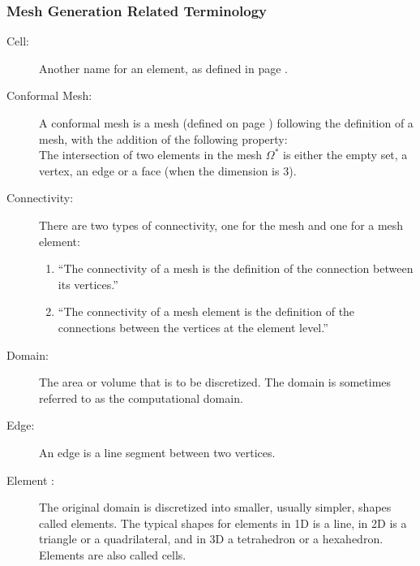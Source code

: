 \documentclass[12pt,titlepage]{article}
\begin{document}
\subsubsection{Mesh Generation Related Terminology\label{AreqMGterm}}
\begin{description}


\item [Cell:] Another name for an element, as defined in page \pageref{AreqElmDef}.

\item[Conformal Mesh:] A conformal mesh is a mesh (defined on page \pageref{def_mesh}) following the definition of a mesh, with the addition of the
following property:\\
The intersection of two elements in the mesh $\Omega^{*}$ is either the empty set, a vertex, an edge or a face (when the
dimension is 3). \citep{FreyAndGeorge2000}

\item [Connectivity:] There are two types of connectivity, one for the mesh and one for a mesh element:
\begin{enumerate}
\item ``The connectivity of a mesh is the definition of the connection between its vertices.''~\citep{FreyAndGeorge2000}
\item ``The connectivity of a mesh element is the definition of the connections between the vertices at the element
level.''~\citep{FreyAndGeorge2000}
\end{enumerate}

\item [Domain:] The area or volume that is to be discretized.  The domain is sometimes referred to as the
computational domain. \citep{Smith2004}


\item [Edge:] An edge is a line segment between two vertices.

\item [Element \label{AreqElmDef}:] The original domain is discretized into smaller, usually simpler, shapes called elements. 
The typical shapes for elements in 1D is a line, in 2D is a triangle or a quadrilateral, and in 3D a tetrahedron or a
hexahedron.  Elements are also called cells. \citep{Smith2004}


\end{description}
\end{document}
